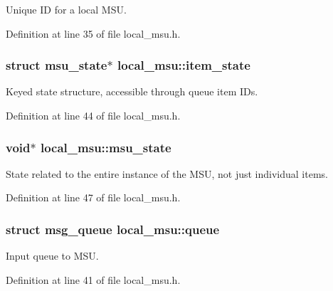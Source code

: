 Unique I\-D for a local M\-S\-U. 



Definition at line 35 of file local\-\_\-msu.\-h.

\hypertarget{structlocal__msu_a1f36b6678f46ffb35e60a8fd4a99a862}{
\subsubsection[{item\-\_\-state}]{\setlength{\rightskip}{0pt plus 5cm}struct {\bf msu\-\_\-state}$\ast$ local\-\_\-msu\-::item\-\_\-state}}\label{structlocal__msu_a1f36b6678f46ffb35e60a8fd4a99a862}


Keyed state structure, accessible through queue item I\-Ds. 



Definition at line 44 of file local\-\_\-msu.\-h.

\hypertarget{structlocal__msu_a4b540cc46b0cc35e4e7684f2d6af7c41}{
\subsubsection[{msu\-\_\-state}]{\setlength{\rightskip}{0pt plus 5cm}void$\ast$ local\-\_\-msu\-::msu\-\_\-state}}\label{structlocal__msu_a4b540cc46b0cc35e4e7684f2d6af7c41}


State related to the entire instance of the M\-S\-U, not just individual items. 



Definition at line 47 of file local\-\_\-msu.\-h.

\hypertarget{structlocal__msu_a33cb8e5c68228acf60cbf1869ff2a395}{
\subsubsection[{queue}]{\setlength{\rightskip}{0pt plus 5cm}struct {\bf msg\-\_\-queue} local\-\_\-msu\-::queue}}\label{structlocal__msu_a33cb8e5c68228acf60cbf1869ff2a395}


Input queue to M\-S\-U. 



Definition at line 41 of file local\-\_\-msu.\-h.

